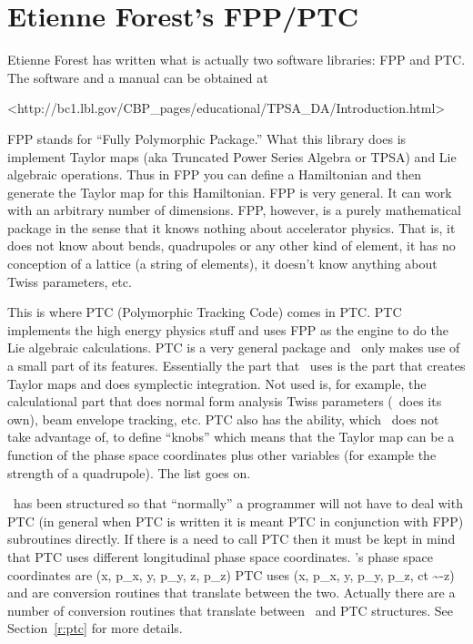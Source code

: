 \chapter{Etienne Forest's FPP/PTC}
\label{c:etienne}


Etienne Forest\cite{b:forest} has written what is actually two
software libraries: FPP and PTC. The software and a manual can be
obtained at
\begin{example} 
    <http://bc1.lbl.gov/CBP_pages/educational/TPSA_DA/Introduction.html>
\end{example}

FPP stands for ``Fully Polymorphic Package.'' What this library does
is implement Taylor maps (aka Truncated Power Series Algebra or TPSA)
and Lie algebraic operations. Thus in FPP you can define a Hamiltonian
and then generate the Taylor map for this Hamiltonian. FPP is very
general. It can work with an arbitrary number of dimensions.  FPP,
however, is a purely mathematical package in the sense that it knows
nothing about accelerator physics. That is, it does not know about
bends, quadrupoles or any other kind of element, it has no conception
of a lattice (a string of elements), it doesn't know anything about
Twiss parameters, etc.

This is where PTC (Polymorphic Tracking Code) comes in PTC. PTC
implements the high energy physics stuff and uses FPP as the engine to
do the Lie algebraic calculations.  PTC is a very general package and
\bmad\ only makes use of a small part of its features. Essentially
the part that \bmad\ uses is the part that creates Taylor maps and
does symplectic integration. Not used is, for example, the
calculational part that does normal form analysis Twiss parameters
(\bmad\ does its own), beam envelope tracking, etc. PTC also has the
ability, which \bmad\ does not take advantage of, to define ``knobs''
which means that the Taylor map can be a function of the phase space
coordinates plus other variables (for example the strength of a
quadrupole). The list goes on. 

\bmad\ has been structured so that ``normally'' a programmer will not have
to deal with PTC (in general when PTC is written it is meant PTC in
conjunction with FPP) subroutines directly. If there is a need to
call PTC then it must be kept in mind that PTC uses different
longitudinal phase space coordinates.
\bmad's phase space coordinates are
\Begineq
  (x, p_x, y, p_y, z, p_z)
\Endeq
PTC uses
\Begineq
  (x, p_x, y, p_y, p_z, ct \sim -z)
\Endeq
{} and  are conversion routines
that translate between the two. Actually there are a number of
conversion routines that translate between \bmad\ and PTC
structures. See Section~\ref{r:ptc} for more details.

